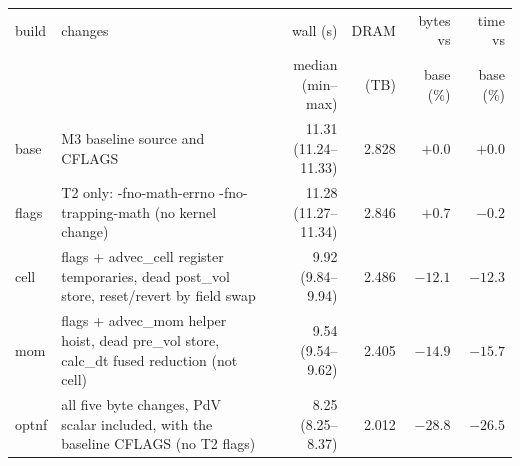 \begin{tabular}{lp{5.4cm}rrrr}
\toprule
build & changes & wall (s) & DRAM & bytes vs & time vs \\
 & & median (min--max) & (TB) & base (\%) & base (\%) \\
\midrule
base & M3 baseline source and CFLAGS & 11.31 (11.24--11.33) & 2.828 & $+0.0$ & $+0.0$ \\
flags & T2 only: -fno-math-errno -fno-trapping-math (no kernel change) & 11.28 (11.27--11.34) & 2.846 & $+0.7$ & $-0.2$ \\
cell & flags + advec\_cell register temporaries, dead post\_vol store, reset/revert by field swap & 9.92 (9.84--9.94) & 2.486 & $-12.1$ & $-12.3$ \\
mom & flags + advec\_mom helper hoist, dead pre\_vol store, calc\_dt fused reduction (not cell) & 9.54 (9.54--9.62) & 2.405 & $-14.9$ & $-15.7$ \\
optnf & all five byte changes, PdV scalar included, with the baseline CFLAGS (no T2 flags) & 8.25 (8.25--8.37) & 2.012 & $-28.8$ & $-26.5$ \\
\bottomrule
\end{tabular}

